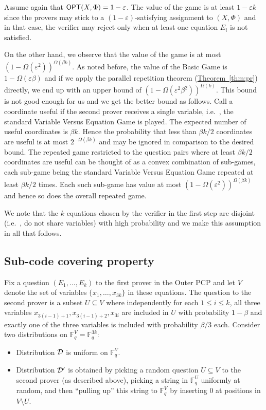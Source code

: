 \documentclass[10pt]{article}
\theoremstyle{definition}
\providecommand{\ie}{i.e.\ }
\numberwithin{equation}{section}
\newcommand{\expref}[2]{\texorpdfstring{\hyperref[#2]{#1~\ref{#2}}}{#1~\ref{#2}}}
\newcommand\F{\mathbb{F}}
\DeclareMathOperator\OPT{{\sf OPT}}
\newcommand{\eps}{\varepsilon}
\begin{document}
Assume again that $\OPT(X,\Phi) = 1-\eps$.  The value of the game is at least $1-\eps k $
since the provers
may stick to a $(1-\eps)$-satisfying assignment to $(X,\Phi)$ and in that case, the verifier may reject only
when at least one equation $E_i$ is not satisfied.

On the other hand, we observe that the value of the game is at most $(1-\Omega(\eps^2))^{\Omega(\beta k)}$.
As noted before, the value of the Basic Game is $1-\Omega(\eps \beta)$ and if we apply the parallel repetition
theorem (\expref{Theorem}{thm:pr}) directly, we end up with an upper bound of
$(1-\Omega(\eps^2 \beta^2))^{\Omega(k)}$. This bound is not good enough for us and
we get the better bound as follows.
Call a coordinate useful if the second prover receives a single variable, \ie,
the standard Variable Versus Equation Game is played. The expected number of useful
coordinates is $\beta k$. Hence the probability that less than $\beta k/2$
coordinates are useful is at most $2^{-\Omega(\beta k)}$ and may be ignored in comparison to the desired bound.
The repeated game restricted to the question pairs where at least $\beta k/2$
coordinates are useful can be thought of as a convex combination of sub-games,
each sub-game being the standard Variable Versus Equation Game repeated at least
$\beta k/2$ times. Each such sub-game has value at most $(1-\Omega(\eps^2))^{\Omega(\beta k)}$
and hence
so does the overall repeated game.

We note that the $k$ equations chosen by the verifier in the first step are
disjoint (\ie, do not share variables)
with high probability and we make this assumption in all that follows.


\subsection{Sub-code covering property}

Fix a question $(E_1, \ldots, E_k)$ to the first prover in the Outer PCP and
let $V$ denote the set of variables $\{x_1,\ldots,x_{3k}\}$ in these equations.
The question to the second prover is a subset $U \subseteq V$ where independently
for each $1 \leq i \leq k$,
all three variables
$x_{3(i-1)+1}, x_{3(i-1)+2}, x_{3i}$ are included in $U$ with probability $1-\beta$ and
exactly one of the three variables is included with probability ${\beta}/{3}$ each.
Consider two
distributions on $\F_q^V = \F_q^{3k}$:
\begin{itemize}
\item Distribution ${\cal D}$ is uniform on $\F_q^{V}$.
\item Distribution ${\cal D'}$
%
%
%
is obtained by picking
a random question $U \subseteq V$ to the second prover (as described above),
picking a string
in $\F_q^U$ uniformly at random, and then ``pulling up'' this string to
$\F_q^V$ by inserting $0$ at positions in $V \setminus U$.
\end{itemize}
\end{document}
